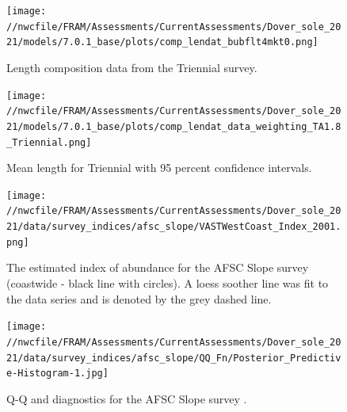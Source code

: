\documentclass[11pt,
  english,
  a4paper,
]{article}
\begin{document}
\begin{figure}
\centering
\texttt{[image: //nwcfile/FRAM/Assessments/CurrentAssessments/Dover\_sole\_2021/models/7.0.1\_base/plots/comp\_lendat\_bubflt4mkt0.png]}
\caption{Length composition data from the Triennial survey.\label{fig:tri-len-data}}
\end{figure}

\tagmcend\tagstructend


\begin{figure}
\centering
\texttt{[image: //nwcfile/FRAM/Assessments/CurrentAssessments/Dover\_sole\_2021/models/7.0.1\_base/plots/comp\_lendat\_data\_weighting\_TA1.8\_Triennial.png]}
\caption{Mean length for Triennial with 95 percent confidence intervals.\label{fig:mean-tri-len-data}}
\end{figure}

\tagmcend\tagstructend


\begin{figure}
\centering
\texttt{[image: //nwcfile/FRAM/Assessments/CurrentAssessments/Dover\_sole\_2021/data/survey\_indices/afsc\_slope/VASTWestCoast\_Index\_2001.png]}
\caption{The estimated index of abundance for the AFSC Slope survey (coastwide - black line with circles). A loess soother line was fit to the data series and is denoted by the grey dashed line.\label{fig:afsc-index}}
\end{figure}

\tagmcend\tagstructend

\newpage


\begin{figure}
\centering
\texttt{[image: //nwcfile/FRAM/Assessments/CurrentAssessments/Dover\_sole\_2021/data/survey\_indices/afsc\_slope/QQ\_Fn/Posterior\_Predictive-Histogram-1.jpg]}
\caption{Q-Q and diagnostics for the AFSC Slope survey .\label{fig:afsc-qq}}
\end{figure}

\tagmcend\tagstructend
\end{document}
